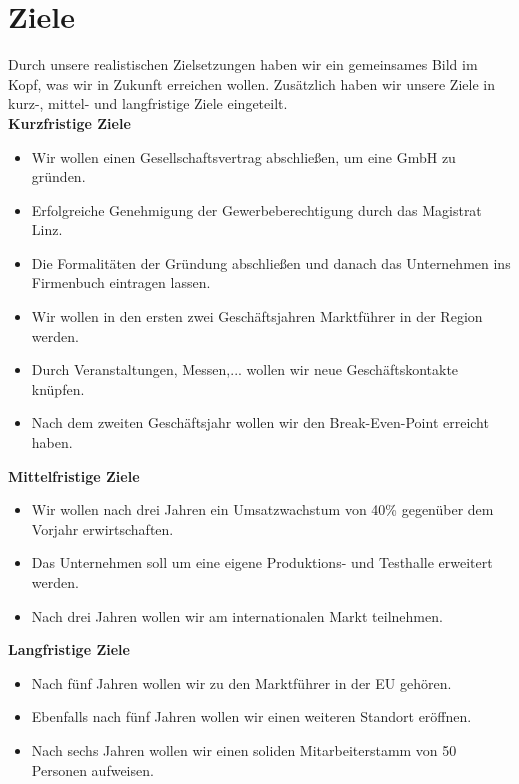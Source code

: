 \newpage

\section{Ziele}
Durch unsere realistischen Zielsetzungen haben wir ein gemeinsames Bild  im Kopf, was wir in Zukunft erreichen wollen. Zusätzlich haben wir unsere Ziele in kurz-, mittel- und langfristige Ziele eingeteilt. \\ 

\textbf{Kurzfristige Ziele}
\begin{itemize}
	\item Wir wollen einen Gesellschaftsvertrag abschließen, um eine GmbH zu gründen.  %
	\item Erfolgreiche Genehmigung der Gewerbeberechtigung durch das Magistrat Linz. %
	\item Die Formalitäten der Gründung abschließen und danach das Unternehmen ins Firmenbuch eintragen lassen.  %
	\item Wir wollen in den ersten zwei Geschäftsjahren Marktführer in der Region werden. %
	\item Durch Veranstaltungen, Messen,... wollen wir neue Geschäftskontakte knüpfen. %
	\item Nach dem zweiten Geschäftsjahr wollen wir den Break-Even-Point erreicht haben. 
\end{itemize} 

\newpage

\textbf{Mittelfristige Ziele}
\begin{itemize}
	\item Wir wollen nach drei Jahren ein Umsatzwachstum von 40\% gegenüber dem Vorjahr erwirtschaften. %
	\item Das Unternehmen soll um eine eigene Produktions- und Testhalle erweitert werden. %
	\item Nach drei Jahren wollen wir am internationalen Markt teilnehmen. \\ %
\end{itemize}

\textbf{Langfristige Ziele}
\begin{itemize}
	\item Nach fünf Jahren wollen wir zu den Marktführer in der EU gehören.  %
	\item Ebenfalls nach fünf Jahren wollen wir einen weiteren Standort eröffnen. %
	\item Nach sechs Jahren wollen wir einen soliden Mitarbeiterstamm von 50 Personen aufweisen. \\%
\end{itemize}

